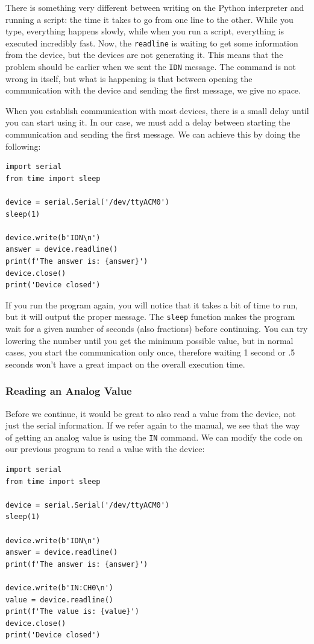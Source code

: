 There is something very different between writing on the Python interpreter and running a script: the time it takes to go from one line to the other. While you type, everything happens slowly, while when you run a script, everything is executed incredibly fast. Now, the \texttt{readline} is waiting to get some information from the device, but the devices are not generating it. This means that the problem should be earlier when we sent the \texttt{IDN} message. The command is not wrong in itself, but what is happening is that between opening the communication with the device and sending the first message, we give no space.

When you establish communication with most devices, there is a small delay until you can start using it. In our case, we must add a delay between starting the communication and sending the first message. We can achieve this by doing the following:

\begin{verbatim}
import serial
from time import sleep

device = serial.Serial('/dev/ttyACM0')
sleep(1)

device.write(b'IDN\n')
answer = device.readline()
print(f'The answer is: {answer}')
device.close()
print('Device closed')
\end{verbatim}

If you run the program again, you will notice that it takes a bit of time to run, but it will output the proper message. The \texttt{sleep} function makes the program wait for a given number of seconds (also fractions) before continuing. You can try lowering the number until you get the minimum possible value, but in normal cases, you start the communication only once, therefore waiting 1 second or .5 seconds won't have a great impact on the overall execution time.

\subsubsection{Reading an Analog Value}
Before we continue, it would be great to also read a value from the device, not just the serial information. If we refer again to the manual, we see that the way of getting an analog value is using the \texttt{IN} command. We can modify the code on our previous program to read a value with the device:

\begin{verbatim}
import serial
from time import sleep

device = serial.Serial('/dev/ttyACM0')
sleep(1)

device.write(b'IDN\n')
answer = device.readline()
print(f'The answer is: {answer}')

device.write(b'IN:CH0\n')
value = device.readline()
print(f'The value is: {value}')
device.close()
print('Device closed')
\end{verbatim}

